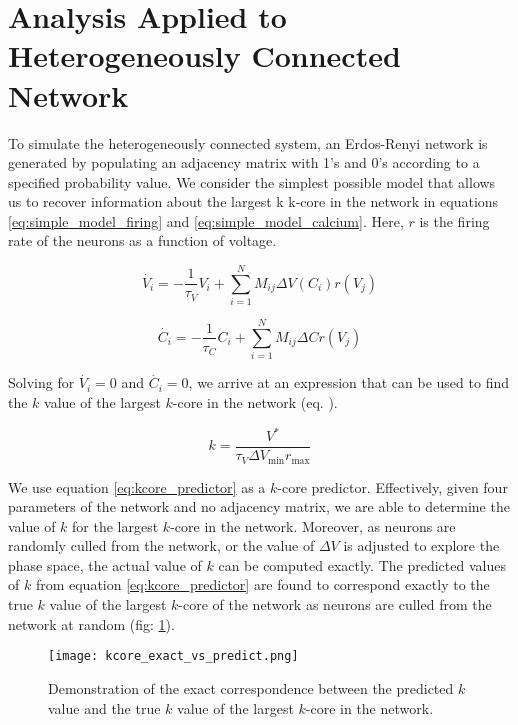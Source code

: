 \documentclass[11pt,letterpaper]{article}
\begin{document}
\section{Analysis Applied to Heterogeneously Connected Network}
To simulate the heterogeneously connected system, an Erdos-Renyi network is generated by populating an adjacency matrix with 1's and 0's according to a specified probability value. We consider the simplest possible model that allows us to recover information about the largest k k-core in the network in equations \ref{eq:simple_model_firing} and \ref{eq:simple_model_calcium}. Here, $r$ is the firing rate of the neurons as a function of voltage.

\begin{equation}
\dot{V_i} = -\frac{1}{\tau _V}V_i + \sum _{i=1} ^{N} M_{ij}\Delta V(C_i) r(V_j)
\label{eq:simple_model_firing}
\end{equation}

\begin{equation}
\dot{C_i} = -\frac{1}{\tau _C} C_i + \sum _{i=1} ^{N} M_{ij}\Delta C r(V_j)
\label{eq:simple_model_calcium}
\end{equation}

Solving for $\dot{V_i} = 0$ and $\dot{C_i} = 0$, we arrive at an expression that can be used to find the $k$ value of the largest $k$-core in the network (eq. ).

\begin{equation}
k=\frac{V^*}{\tau _V \Delta V_{\text{min}} r_{\text{max}}}
\label{eq:kcore_predictor}
\end{equation}

We use equation \ref{eq:kcore_predictor} as a $k$-core predictor. Effectively, given four parameters of the network and no adjacency matrix, we are able to determine the value of $k$ for the largest $k$-core in the network. Moreover, as neurons are randomly culled from the network, or the value of $\Delta V$ is adjusted to explore the phase space, the actual value of $k$ can be computed exactly. The predicted values of $k$ from equation \ref{eq:kcore_predictor} are found to correspond exactly to the true $k$ value of the largest $k$-core of the network as neurons are culled from the network at random (fig: \ref{fig:kcore_exact_vs_predict}).

\begin{figure}[ht]
	\centering
    	\texttt{[image: kcore\_exact\_vs\_predict.png]}\\
    \caption{Demonstration of the exact correspondence between the predicted $k$ value and the true $k$ value of the largest $k$-core in the network.}
    \label{fig:kcore_exact_vs_predict}
\end{figure}
\end{document}
